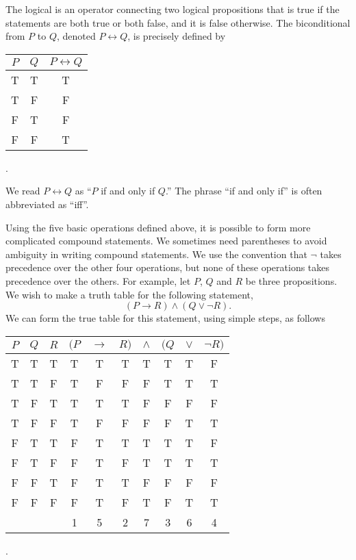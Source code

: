 The logical  is an operator connecting two logical propositions that is true if the statements are both true or both false, and it is false otherwise.
The biconditional from $P$ to $Q$, denoted $P \leftrightarrow Q$, is precisely defined by
\begin{center}
\begin{tabular}{|c|c|c|}
\hline
$P$ & $Q$ & $P \leftrightarrow Q$ \\
\hline
T & T & T \\
T & F & F \\
F & T & F \\
F & F & T \\
\hline
\end{tabular} .
\end{center}
We read $P \leftrightarrow Q$ as ``$P$ if and only if $Q$.''
The phrase ``if and only if'' is often abbreviated as ``iff''.

Using the five basic operations defined above, it is possible to form more complicated compound statements.
We sometimes need parentheses to avoid ambiguity in writing compound statements.
We use the convention that $\neg$ takes precedence over the other four operations, but none of these operations takes precedence over the others.
For example, let $P$, $Q$ and $R$ be three propositions.
We wish to make a truth table for the following statement,
\begin{equation} \label{equation:LogicStatement}
(P \rightarrow R) \wedge (Q \vee \neg R) .
\end{equation}
We can form the true table for this statement, using simple steps, as follows
\begin{center}
\begin{tabular}{|c|c|c|ccccccc|}
\hline
$P$ & $Q$ & $R$
& $(P$ & $\rightarrow$ & $R)$ & $\wedge$ & $(Q$ & $\vee$ & $\neg R)$ \\
\hline
T & T & T & T & T & T & T & T & T & F \\
T & T & F & T & F & F & F & T & T & T \\
T & F & T & T & T & T & F & F & F & F \\
T & F & F & T & F & F & F & F & T & T \\
F & T & T & F & T & T & T & T & T & F \\
F & T & F & F & T & F & T & T & T & T \\
F & F & T & F & T & T & F & F & F & F \\
F & F & F & F & T & F & T & F & T & T \\
& & & 1 & 5 & 2 & 7 & 3 & 6 & 4 \\
\hline
\end{tabular} .
\end{center}

